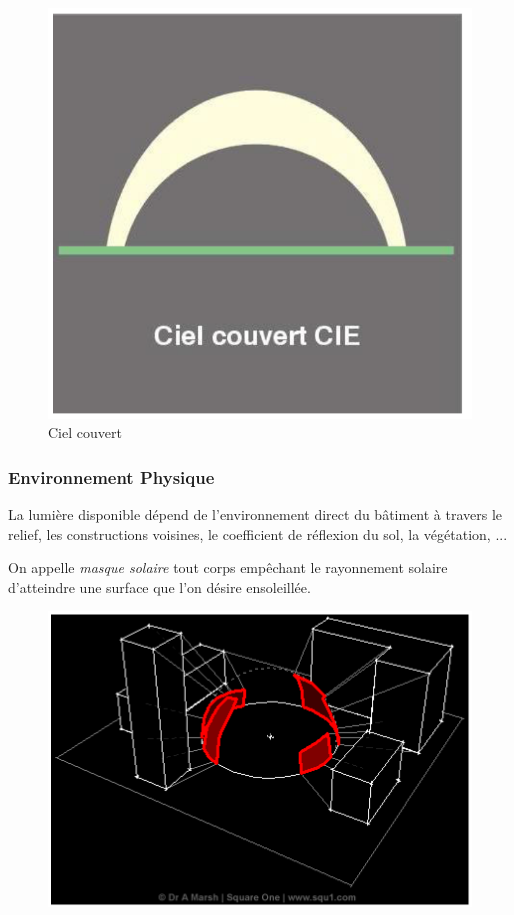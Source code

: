 \documentclass[11pt]{report}
\begin{document}
\begin{figure}[h]
\centering
\includegraphics[scale=0.3]{couv}
\caption{Ciel couvert}
\label{cie}
\end{figure}




\subsubsection{Environnement Physique}
La lumière disponible dépend de l'environnement direct du bâtiment à travers le relief, les constructions voisines, le coefficient de réflexion du sol, la végétation, ...


On appelle \textit{masque solaire} tout corps empêchant le rayonnement solaire d'atteindre une surface que l'on désire ensoleillée.

\begin{figure}[h]
\centering
\includegraphics[scale=0.3]{masq}
\end{figure}
\end{document}
